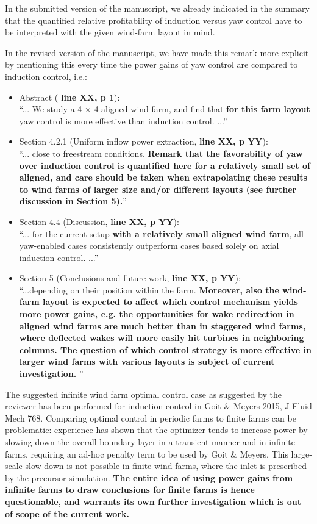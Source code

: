 \documentclass[]{article}
\newcommand{\red}[1]{\textbf{\color{red} #1}}
\newcommand{\revision}[1]{\textbf{#1}}
\begin{document}
In the submitted version of the manuscript, we already indicated in the summary that the quantified relative profitability of induction versus yaw control have to be interpreted with the given wind-farm layout in mind. 

In the revised version of the manuscript, we have made this remark more explicit by mentioning this every time the power gains of yaw control are compared to induction control, i.e.: 
\begin{itemize}
	 \item Abstract (\red{line XX, p 1}): \\ ``... We study a 4 $\times$ 4 aligned wind farm, and find that \revision{for this farm layout} yaw control is more effective than induction control. ...''
	 \item Section 4.2.1 (Uniform inflow power extraction, \red{line XX, p YY}): \\``... close to freestream conditions. \revision{Remark that the favorability of yaw over induction control is quantified here for a relatively small set of aligned, and care should be taken when extrapolating these results to wind farms of larger size and/or different layouts (see further discussion in Section 5).}''
	 \item Section 4.4 (Discussion, \red{line XX, p YY}): \\``... for the current setup \revision{with a relatively small aligned wind farm}, all yaw-enabled cases consistently outperform cases based solely on axial induction control. ...''
	 \item Section 5 (Conclusions and future work, \red{line XX, p YY}): \\``...depending on their position within the farm. \revision{Moreover, also the wind-farm layout is expected to affect which control mechanism yields more power gains, e.g. the opportunities for wake redirection in aligned wind farms are much better than in staggered wind farms, where deflected wakes will more easily hit turbines in neighboring columns. The question of which control strategy is more effective in larger wind farms with various layouts is subject of current investigation.} ''
\end{itemize}



The suggested infinite wind farm optimal control case as suggested by the reviewer has been performed for induction control in Goit \& Meyers 2015, J Fluid Mech 768. Comparing optimal control in periodic farms to finite farms can be problematic: experience has shown that the optimizer tends to increase power by slowing down the overall boundary layer in a transient manner and in infinite farms, requiring an ad-hoc penalty term to be used by Goit \& Meyers. This large-scale slow-down is not possible in finite wind-farms, where the inlet is prescribed by the precursor simulation. \red{The entire idea of using power gains from infinite farms to draw conclusions for finite farms is hence questionable, and warrants its own further investigation which is out of scope of the current work.} 
\end{document}
